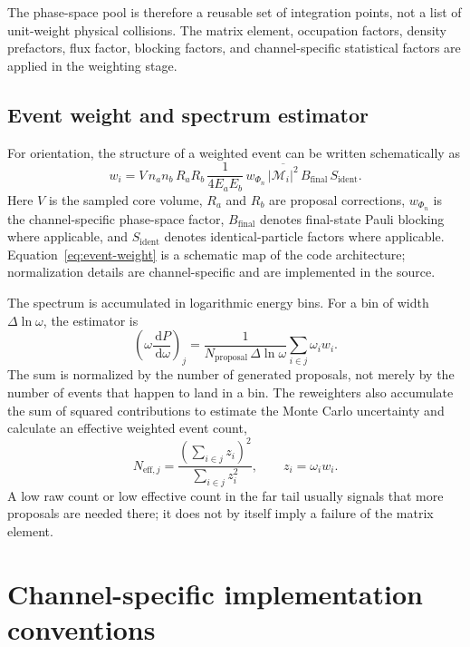 \documentclass[11pt,a4paper]{article}
\newcommand{\dd}{\,\mathrm{d}}
\newcommand{\M}{\mathcal{M}}
\begin{document}
The phase-space pool is therefore a reusable set of integration points, not a list of unit-weight physical collisions. The matrix element, occupation factors, density prefactors, flux factor, blocking factors, and channel-specific statistical factors are applied in the weighting stage.

\subsection{Event weight and spectrum estimator}

For orientation, the structure of a weighted event can be written schematically as
\begin{equation}
 w_i = V\,n_a n_b\,R_aR_b\,
 \frac{1}{4E_aE_b}\,w_{\Phi_n}\,\overline{|\M_i|^2}\,
 B_{\mathrm{final}}\,S_{\mathrm{ident}}.
 \label{eq:event-weight}
\end{equation}
Here $V$ is the sampled core volume, $R_a$ and $R_b$ are proposal corrections, $w_{\Phi_n}$ is the channel-specific phase-space factor, $B_{\mathrm{final}}$ denotes final-state Pauli blocking where applicable, and $S_{\mathrm{ident}}$ denotes identical-particle factors where applicable. Equation~\eqref{eq:event-weight} is a schematic map of the code architecture; normalization details are channel-specific and are implemented in the source.

The spectrum is accumulated in logarithmic energy bins. For a bin of width $\Delta\ln\omega$, the estimator is
\begin{equation}
 \left(\omega\frac{\dd P}{\dd\omega}\right)_j
 = \frac{1}{N_{\mathrm{proposal}}\,\Delta\ln\omega}
   \sum_{i\in j}\omega_i w_i.
 \label{eq:spectrum-estimator}
\end{equation}
The sum is normalized by the number of generated proposals, not merely by the number of events that happen to land in a bin. The reweighters also accumulate the sum of squared contributions to estimate the Monte Carlo uncertainty and calculate an effective weighted event count,
\begin{equation}
 N_{\mathrm{eff},j}=\frac{(\sum_{i\in j}z_i)^2}{\sum_{i\in j}z_i^2},
 \qquad z_i=\omega_i w_i.
\end{equation}
A low raw count or low effective count in the far tail usually signals that more proposals are needed there; it does not by itself imply a failure of the matrix element.

\section{Channel-specific implementation conventions}
\end{document}
